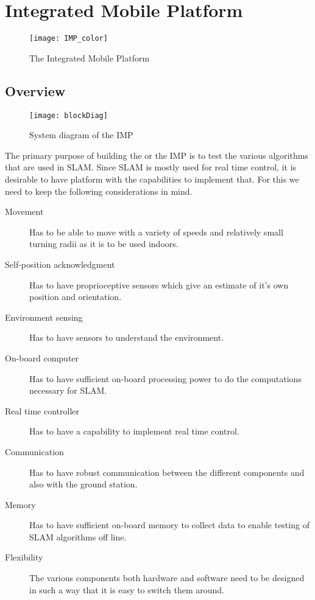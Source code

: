 \chapter{Integrated Mobile Platform}
\label{cha:Platform}

\begin{figure}
\centering
\texttt{[image: IMP\_color]}
\caption{The Integrated Mobile Platform}
\end{figure}

\section{Overview}
\begin{figure}
\centering
\texttt{[image: blockDiag]}
\caption{System diagram of the IMP}
\label{fig: blockDiag}
\end{figure}
The primary purpose of building the \imp or the IMP is to test the various algorithms that are used in SLAM. Since SLAM is mostly used for real time control, it is desirable to have platform with the capabilities to implement that. For this we need to keep the following considerations in mind. 
\begin{description}
	\item[Movement] Has to be able to move with a variety of speeds and relatively small turning radii as it is to be used indoors. 
	\item[Self-position acknowledgment] Has to have proprioceptive sensors which give an estimate of it's own position and orientation.
	\item[Environment sensing] Has to have sensors to understand the environment. 
	\item[On-board computer] Has to have sufficient on-board processing power to do the computations necessary for SLAM.
	\item[Real time controller] Has to have a capability to implement real time control.
	\item[Communication] Has to have robust communication between the different components and also with the ground station. 
	\item[Memory] Has to have sufficient on-board memory to collect data to enable testing of SLAM algorithms off line.  
	\item[Flexibility] The various components both hardware and software need to be designed in such a way that it is easy to switch them around.
\end{description}

